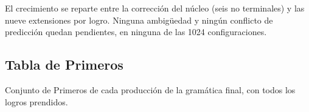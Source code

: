 El crecimiento se reparte entre la corrección del núcleo (seis no terminales) y las nueve
extensiones por logro. Ninguna ambigüedad y ningún conflicto de predicción quedan pendientes, en
ninguna de las 1024 configuraciones.

\subsection{Tabla de Primeros}

Conjunto de Primeros de cada producción de la gramática final, con todos los logros prendidos.


